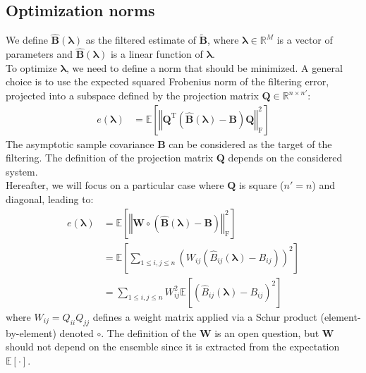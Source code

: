 \documentclass[12pt]{scrartcl}
\begin{document}
\subsection{Optimization norms}
We define $\widehat{\mathbf{B}}\left(\boldsymbol{\lambda}\right)$ as the filtered estimate of $\widetilde{\mathbf{B}}$, where $\boldsymbol{\lambda} \in \mathbb{R}^M$ is a vector of parameters and $\widehat{\mathbf{B}}\left(\boldsymbol{\lambda}\right)$ is a linear function of $\boldsymbol{\lambda}$.\\
$  $\\
To optimize $\boldsymbol{\lambda}$, we need to define a norm that should be minimized. A general choice is to use the expected squared Frobenius norm of the filtering error, projected into a subspace defined by the projection matrix $\mathbf{Q} \in \mathbb{R}^{n \times n'}$:
\begin{align}
\label{eq:norm_proj}
e\left(\boldsymbol{\lambda}\right) & = \mathbb{E}\left[ \left\Vert \mathbf{Q}^\mathrm{T} \left(\widehat{\mathbf{B}}\left(\boldsymbol{\lambda}\right) - \mathbf{B} \right) \mathbf{Q} \right\Vert_\mathrm{F}^2 \right] 
\end{align}
The asymptotic sample covariance $\mathbf{B}$ can be considered as the target of the filtering. The definition of the projection matrix $\mathbf{Q}$ depends on the considered system.\\
$  $\\
Hereafter, we will focus on a particular case where $\mathbf{Q}$ is square ($n' = n$) and diagonal, leading to:
\begin{align}
\label{eq:norm_proj_2}
e\left(\boldsymbol{\lambda}\right) & = \mathbb{E}\left[ \left\Vert \mathbf{W} \circ \left(\widehat{\mathbf{B}}\left(\boldsymbol{\lambda}\right) - \mathbf{B} \right) \right\Vert_\mathrm{F}^2 \right] \nonumber \\
& = \mathbb{E}\left[ \sum_{1 \le i,j \le n} \left(W_{ij} \left(\widehat{B}_{ij}\left(\boldsymbol{\lambda}\right) - B_{ij} \right) \right)^2 \right] \nonumber \\
& = \sum_{1 \le i,j \le n} W^2_{ij} \mathbb{E}\left[\left(\widehat{B}_{ij}\left(\boldsymbol{\lambda}\right) - B_{ij} \right)^2\right]
\end{align}
where $W_{ij} = Q_{ii} Q_{jj}$ defines a weight matrix applied via a Schur product (element-by-element) denoted $\circ$. The definition of the $\mathbf{W}$ is an open question, but $\mathbf{W}$ should not depend on the ensemble since it is extracted from the expectation $\mathbb{E}\left[\cdot\right]$.
\end{document}
